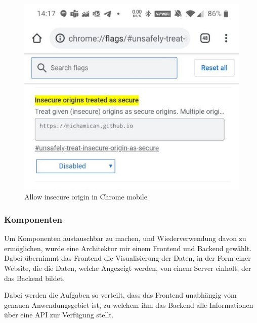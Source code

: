 \begin{figure}
	\centering
	\includegraphics[width=.75\linewidth]{images/InsecureOriginsSettings}
	\caption{Allow insecure origin in Chrome mobile}
	\label{fig:insecureOriginsSettings}
\end{figure}

%	


\subsubsection{Komponenten}

Um Komponenten austauschbar zu machen, und Wiederverwendung davon zu
ermöglichen, wurde eine Architektur mir einem Frontend und Backend
gewählt. Dabei übernimmt das Frontend die Visualisierung der Daten,
in der Form einer Website, die die Daten, welche Angezeigt werden,
von einem Server einholt, der das Backend bildet.

Dabei werden die Aufgaben so verteilt, dass das Frontend unabhängig
vom genauen Anwendungsgebiet ist, zu welchem ihm das Backend alle
Informationen über eine API zur Verfügung stellt.


